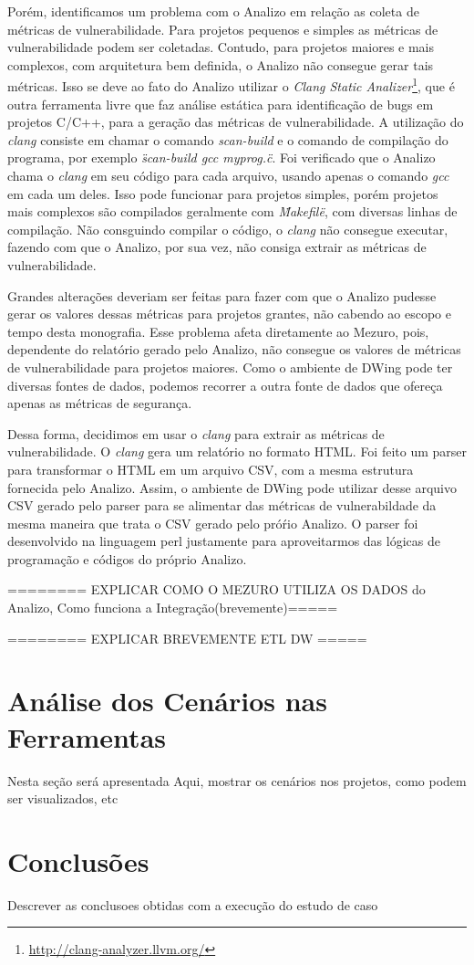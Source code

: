 Porém, identificamos um problema com o Analizo em relação as coleta de métricas de vulnerabilidade. Para projetos pequenos e simples as métricas de vulnerabilidade podem ser coletadas.  Contudo, para projetos maiores e mais complexos, com arquitetura bem definida, o Analizo não consegue gerar tais métricas. Isso se deve ao fato do Analizo utilizar o \emph{Clang Static Analizer}\footnote{\url{http://clang-analyzer.llvm.org/}}, que é outra ferramenta livre que faz análise estática para identificação de bugs em projetos C/C++, para a geração das métricas de vulnerabilidade. A utilização do \emph{clang} consiste em chamar o comando \emph{scan-build}  e o comando de compilação do programa, por exemplo \emph{\"scan-build gcc myprog.c\"}. Foi verificado que o Analizo chama o \emph{clang} em seu código para cada arquivo, usando apenas o comando \emph{gcc} em cada um deles. Isso pode funcionar para projetos simples, porém projetos mais complexos são compilados geralmente com \emph{\"Makefile\"}, com diversas linhas de compilação. Não consguindo compilar o código, o \emph{clang} não consegue executar, fazendo com que o Analizo, por sua vez, não consiga extrair as métricas de vulnerabilidade. 

Grandes alterações deveriam ser feitas para fazer com que o Analizo pudesse gerar os valores dessas métricas para projetos grantes, não cabendo ao escopo e tempo desta monografia. Esse problema afeta diretamente ao Mezuro, pois, dependente do relatório gerado pelo Analizo, não consegue os valores de métricas de vulnerabilidade para projetos maiores. Como o ambiente de DWing pode ter diversas fontes de dados, podemos recorrer a outra fonte de dados que ofereça apenas as métricas de segurança.

Dessa forma, decidimos em usar o \emph{clang} para extrair as métricas de vulnerabilidade. O \emph{clang} gera um relatório no formato HTML. Foi feito um parser para transformar o HTML em um arquivo CSV, com a mesma estrutura fornecida pelo Analizo. Assim, o ambiente de DWing pode utilizar desse arquivo CSV gerado pelo parser para se alimentar das métricas de vulnerabildade da mesma maneira que trata o CSV gerado pelo próŕio Analizo. O parser foi desenvolvido na linguagem perl justamente para aproveitarmos das lógicas de programação e códigos do próprio Analizo.

======== EXPLICAR COMO O MEZURO UTILIZA OS DADOS do Analizo, Como funciona a Integração(brevemente)=====


======== EXPLICAR BREVEMENTE ETL DW =====



\section{Análise dos Cenários nas Ferramentas}

Nesta seção será apresentada Aqui, mostrar os cenários nos projetos, como podem ser visualizados, etc


\section{Conclusões}

Descrever as conclusoes obtidas com a execução do estudo de caso